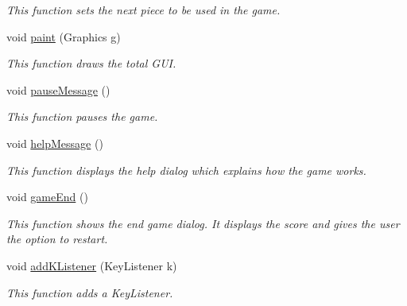 \begin{DoxyCompactItemize}
\begin{DoxyCompactList}\small\item\em This function sets the next piece to be used in the game. \end{DoxyCompactList}\item 
void \hyperlink{class_project_tetris_1_1_group11_1_1_view_1_1_painter_a46e1918a50b4a755e11a69cc723cbea4}{paint} (Graphics g)
\begin{DoxyCompactList}\small\item\em This function draws the total G\+UI. \end{DoxyCompactList}\item 
\hypertarget{class_project_tetris_1_1_group11_1_1_view_1_1_painter_adb62ac5b3377412acc93fb130b4f0572}{}\label{class_project_tetris_1_1_group11_1_1_view_1_1_painter_adb62ac5b3377412acc93fb130b4f0572} 
void \hyperlink{class_project_tetris_1_1_group11_1_1_view_1_1_painter_adb62ac5b3377412acc93fb130b4f0572}{pause\+Message} ()
\begin{DoxyCompactList}\small\item\em This function pauses the game. \end{DoxyCompactList}\item 
\hypertarget{class_project_tetris_1_1_group11_1_1_view_1_1_painter_ad8357a7fc5aaa6aa172f63dd46b58f56}{}\label{class_project_tetris_1_1_group11_1_1_view_1_1_painter_ad8357a7fc5aaa6aa172f63dd46b58f56} 
void \hyperlink{class_project_tetris_1_1_group11_1_1_view_1_1_painter_ad8357a7fc5aaa6aa172f63dd46b58f56}{help\+Message} ()
\begin{DoxyCompactList}\small\item\em This function displays the help dialog which explains how the game works. \end{DoxyCompactList}\item 
\hypertarget{class_project_tetris_1_1_group11_1_1_view_1_1_painter_a5e22d20a037a80e2936a486a66f680d3}{}\label{class_project_tetris_1_1_group11_1_1_view_1_1_painter_a5e22d20a037a80e2936a486a66f680d3} 
void \hyperlink{class_project_tetris_1_1_group11_1_1_view_1_1_painter_a5e22d20a037a80e2936a486a66f680d3}{game\+End} ()
\begin{DoxyCompactList}\small\item\em This function shows the end game dialog. It displays the score and gives the user the option to restart. \end{DoxyCompactList}\item 
void \hyperlink{class_project_tetris_1_1_group11_1_1_view_1_1_painter_a37087ff7a1129d874296ec5bb3ef09d1}{add\+K\+Listener} (Key\+Listener k)
\begin{DoxyCompactList}\small\item\em This function adds a Key\+Listener. \end{DoxyCompactList}\end{DoxyCompactItemize}
